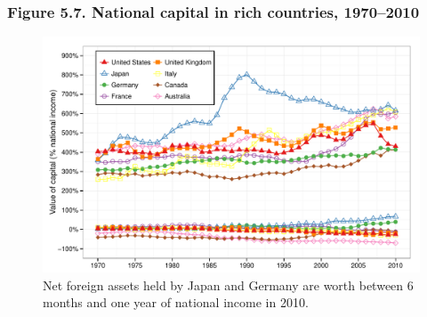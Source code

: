 \documentclass[t]{beamer}\usepackage[]{graphicx}\usepackage[]{color}
\newenvironment{knitrout}{}{} %
\begin{document}
\begin{frame}[label=Figure_5_7]
\frametitle{Figure 5.7. National capital in rich countries, 1970--2010}
\begin{figure}[t]
\begin{minipage}[b]{\textwidth}
\centering
\begin{knitrout}\footnotesize
{}\color{fgcolor}

{\centering \includegraphics[width=1\linewidth]{figures/color/Figure_5_7} 

}



\end{knitrout}
\caption{Net foreign assets held by Japan and Germany are worth between 6 months and one year of national income in 2010.}
\end{minipage}
\end{figure}
\end{frame}
\end{document}
